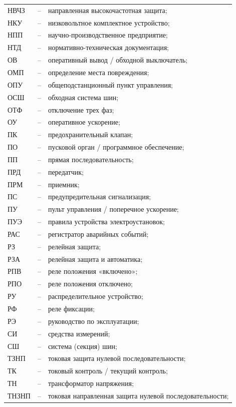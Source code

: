 \begin{longtable}{>{\raggedright\arraybackslash}m{2cm}>{\raggedright\arraybackslash}m{0.5cm}>{\raggedright\arraybackslash}m{20cm}}
НВЧЗ & -- & направленная высокочастотная защита; \\
НКУ & -- & низковольтное комплектное устройство; \\
НПП & -- & научно-производственное предприятие; \\
НТД & -- & нормативно-техническая документация; \\
ОВ & -- & оперативный вывод / обходной выключатель; \\
ОМП & -- & определение места повреждения; \\
ОПУ & -- & общеподстанционный пункт управления; \\
ОСШ & -- & обходная система шин; \\
ОТФ & -- & отключение трех фаз; \\
ОУ & -- & оперативное ускорение; \\
ПК & -- & предохранительный клапан; \\
ПО & -- & пусковой орган / программное обеспечение; \\
ПП & -- & прямая последовательность; \\
ПРД & -- & передатчик; \\
ПРМ & -- & приемник; \\
ПС & -- & предупредительная сигнализация; \\
ПУ & -- & пульт управления / поперечное ускорение; \\
ПУЭ & -- & правила устройства электроустановок; \\
РАС & -- & регистратор аварийных событий; \\
РЗ & -- & релейная защита; \\
РЗА & -- & релейная защита и автоматика; \\
РПВ & -- & реле положения «включено»; \\
РПО & -- & реле положения отключено; \\
РУ & -- & распределительное устройство; \\
РФ & -- & реле фиксации; \\
РЭ & -- & руководство по эксплуатации; \\
СИ & -- & средства измерений; \\
СШ & -- & система (секция) шин; \\
ТЗНП & -- & токовая защита нулевой последовательности; \\
ТК & -- & токовый контроль / текущий контроль; \\
ТН & -- & трансформатор напряжения; \\
ТНЗНП & -- & токовая направленная защита нулевой последовательности; \\

\end{longtable}
